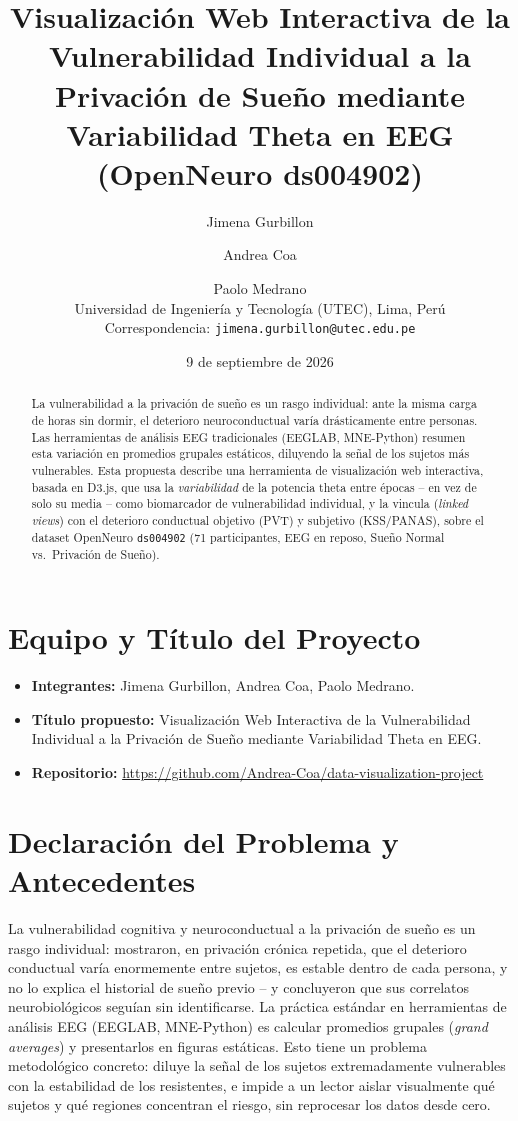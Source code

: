 \documentclass[10pt]{article}
\title{\vspace{-2.5em}\Large Visualización Web Interactiva de la Vulnerabilidad Individual a la Privación de Sueño mediante Variabilidad Theta en EEG (OpenNeuro ds004902)}
\author{\normalsize Jimena Gurbillon \and \normalsize Andrea Coa \and \normalsize Paolo Medrano \\[2pt]
\small Universidad de Ingeniería y Tecnología (UTEC), Lima, Perú \\
\small Correspondencia: \texttt{jimena.gurbillon@utec.edu.pe}}
\date{\small 9 de septiembre de 2026}
\begin{document}
\maketitle
\thispagestyle{fancy}

\begin{abstract}
\noindent La vulnerabilidad a la privación de sueño es un rasgo individual: ante la misma carga de horas sin dormir, el deterioro neuroconductual varía drásticamente entre personas. Las herramientas de análisis EEG tradicionales (EEGLAB, MNE-Python) resumen esta variación en promedios grupales estáticos, diluyendo la señal de los sujetos más vulnerables. Esta propuesta describe una herramienta de visualización web interactiva, basada en D3.js, que usa la \emph{variabilidad} de la potencia theta entre épocas -- en vez de solo su media -- como biomarcador de vulnerabilidad individual, y la vincula (\emph{linked views}) con el deterioro conductual objetivo (PVT) y subjetivo (KSS/PANAS), sobre el dataset OpenNeuro \texttt{ds004902} (71 participantes, EEG en reposo, Sueño Normal vs.\ Privación de Sueño).
\end{abstract}

\section{Equipo y Título del Proyecto}
\begin{itemize}
    \item \textbf{Integrantes:} Jimena Gurbillon, Andrea Coa, Paolo Medrano.
    \item \textbf{Título propuesto:} Visualización Web Interactiva de la Vulnerabilidad Individual a la Privación de Sueño mediante Variabilidad Theta en EEG.
    \item \textbf{Repositorio:} \url{https://github.com/Andrea-Coa/data-visualization-project}
\end{itemize}

\section{Declaración del Problema y Antecedentes}
La vulnerabilidad cognitiva y neuroconductual a la privación de sueño es un rasgo individual: \citet{vandongen2004} mostraron, en privación crónica repetida, que el deterioro conductual varía enormemente entre sujetos, es estable dentro de cada persona, y no lo explica el historial de sueño previo -- y concluyeron que sus correlatos neurobiológicos seguían sin identificarse. La práctica estándar en herramientas de análisis EEG (EEGLAB, MNE-Python) es calcular promedios grupales (\emph{grand averages}) y presentarlos en figuras estáticas. Esto tiene un problema metodológico concreto: diluye la señal de los sujetos extremadamente vulnerables con la estabilidad de los resistentes, e impide a un lector aislar visualmente qué sujetos y qué regiones concentran el riesgo, sin reprocesar los datos desde cero.
\end{document}
